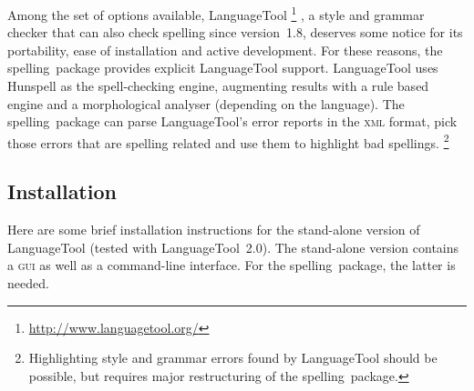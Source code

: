 \documentclass[11pt]{article}
\newcommand*{\pkg}{\textsf{spelling}}
\newcommand*{\acr}[1]{\mbox{\scshape#1}}
\begin{document}
Among the set of options available, LanguageTool%
\footnote{\url{http://www.languagetool.org/}}%
%
, a style and grammar checker that can also check spelling since
version~1.8, deserves some notice for its portability, ease of
installation and active development.  For these reasons, the \pkg\
package provides explicit LanguageTool support.  LanguageTool uses
Hunspell as the spell-checking engine, augmenting results with a rule
based engine and a morphological analyser (depending on the language).
The \pkg\ package can parse LanguageTool's error reports in the
\acr{xml} format, pick those errors that are spelling related and use
them to highlight bad spellings.%
\footnote{Highlighting style and grammar errors found by LanguageTool
  should be possible, but requires major restructuring of the \pkg\
  package.}


\subsection{Installation}
\label{sec:lt-installation}

Here are some brief installation instructions for the stand-alone
version of LanguageTool (tested with LanguageTool~2.0).  The stand-alone
version contains a \acr{gui} as well as a command-line interface.  For
the \pkg\ package, the latter is needed.
\end{document}
